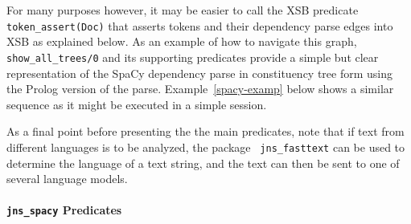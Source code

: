 For many purposes however, it may be easier to call the XSB predicate {\tt
  token\_assert(Doc)} that asserts tokens and their dependency parse
edges into XSB as explained below.  As an example of how to navigate
this graph, {\tt show\_all\_trees/0} and its supporting predicates
provide a simple but clear representation of the SpaCy dependency
parse in constituency tree form using the Prolog version of the parse.
Example~\ref{spacy-examp} below shows a similar sequence as it might
be executed in a simple session.



As a final point before presenting the the main predicates, note that
if text from different languages is to be analyzed, the package {\tt
  jns\_fasttext} can be used to determine the language of a text
string, and the text can then be sent to one of several language
models. 

\paragraph{{\tt jns\_spacy} Predicates}

